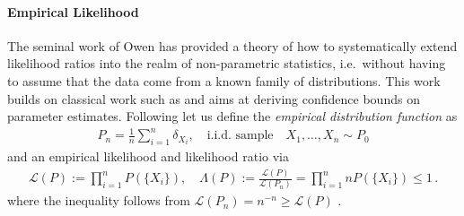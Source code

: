 \documentclass{article}
\newcommand{\Ell}{{\mathcal L}}
\begin{document}
\paragraph{Empirical Likelihood} 
The seminal work of Owen \cite{owen1990empirical,owen2001empirical} has provided a theory of how to systematically extend likelihood ratios into the realm of non-parametric statistics, i.e.~without having to assume that the data come from a known family of distributions. This work builds on classical work such as \cite{kiefer1956consistency,thomas1975confidence} and aims at deriving confidence bounds on parameter estimates. Following \cite[Chapter 2, 3]{owen2001empirical} let us define the \textit{empirical distribution function} as 
\begin{align}
P_n = \frac 1n \sum_{i=1}^n \delta_{X_i}, \quad \text{i.i.d.~sample} \quad X_1,\dots, X_n \sim P_0
\end{align}
and an empirical  likelihood and likelihood ratio  via
\begin{align}
\Ell(P) := \prod_{i=1}^n P(\{ X_i\}), \quad 
\Lambda(P) := \frac{\Ell(P)}{\Ell(P_n)}  = \prod_{i=1}^n n P(\{ X_i\})
\le 1\,.
\end{align}
where the inequality follows from $\Ell(P_n) = n^{-n}\ge \Ell(P)$ \cite[Theorem 3.1]{owen2001empirical}.
\end{document}

